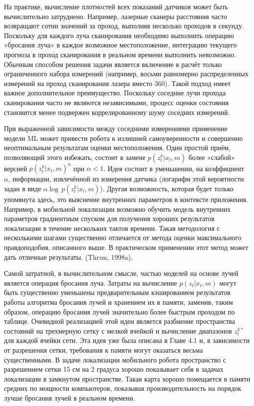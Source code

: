\documentclass[10pt,a4paper]{article}
\begin{document}
На практике, вычисление плотностей всех показаний датчиков может быть вычислительно затруднено. Например, лазерные сканеры расстояния часто возвращают сотни значений за проход, выполняя несколько проходов в секунду. Поскольку для каждого луча сканирования необходимо выполнить операцию «бросания луча» в каждое возможное местоположение, интеграцию текущего прогноза в проход сканирования в реальном времени выполнить невозможно. Обычным способом решения задачи является включение в расчёт только ограниченного набора измерений (например, восьми равномерно распределенных измерений на проход сканирования лазера вместо 360). Такой подход имеет важное дополнительное преимущество. Поскольку соседние лучи прохода сканирования часто не являются независимыми, процесс оценки состояния становится менее подвержен коррелированному шуму соседних измерений.

При выраженной зависимости между соседними измерениями применение модели ML может привести робота к излишней самоуверенности и совершенно неоптимальным результатам оценки местоположения. Один простой приём, позволяющий этого избежать, состоит в замене $p(z_t^k | x_t, m)$ более «слабой» версией $p(z_t^k | x_t, m)^\alpha$ при $\alpha < 1$. Идея состоит в уменьшении, на коэффициент $\alpha$, информации, извлечённой из измерения датчика (логарифм этой вероятности задан в виде $\alpha\log\, p(z_t^k | x_t, m)$). Другая возможность, которая будет только упомянута здесь, это выяснение внутренних параметров в контексте приложения. Например, в мобильной локализации возможно обучить модель внутренних параметров градиентным спуском для получения хороших результатов локализации в течение нескольких тактов времени. 
Такая методология с несколькими шагами существенно отличается от метода оценки максимального правдоподобия, описанного выше. В практическом применении этот метод может дать отличные результаты. (Thrun, 1998a).

Самой затратной, в вычислительном смысле, частью моделей на основе лучей является операция бросания луча. Затраты на вычисление $p(z_t | x_t, m)$ могут быть существенно уменьшены предварительным кэшированием результатов работы алгоритма бросания лучей и хранением их в памяти, заменив, таким образом, операцию бросания лучей значительно более быстрым проходом по таблице. Очевидной реализацией этой идеи является разбиение пространства состояний на трехмерную сетку с мелкой ячейкой и вычисление диапазонов $z_t^{k*}$ для каждой ячейки сети. Эта идея уже была описана в Главе 4.1 и, в зависимости от разрешения сетки, требования к памяти могут оказаться весьма существенными. В задаче локализации мобильного робота пространство с разрешением сетки 15 см на 2 градуса хорошо показывает себя в задачах локализации в замкнутом пространстве. Такая карта хорошо помещается в памяти средних по мощности компьютеров, показывая производительность на порядок лучше бросания лучей в реальном времени.\\
\end{document}
